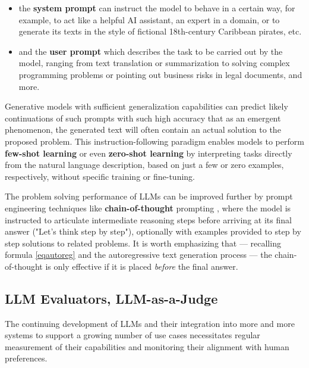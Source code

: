 \documentclass[UTF8,noindent,nohyp,parspace,titlepage,twoside,12pt]{article}
\begin{document}
      \begin{itemize}
        \item the \textbf{system prompt} can instruct the model to behave in a
              certain way, for example, to act like a helpful AI assistant,
              an expert in a domain, or to generate its texts in the style of
              fictional 18th-century Caribbean pirates, etc.

        \item and the \textbf{user prompt} which describes the task to be
              carried out by the model, ranging from text translation or
              summarization to solving complex programming problems or pointing
              out business risks in legal documents, and more.
      \end{itemize}

      Generative models with sufficient generalization capabilities can predict
      likely continuations of such prompts with such high accuracy that as an
      emergent phenomenon, the generated text will often contain an actual
      solution to the proposed problem. This instruction-following paradigm
      enables models to perform \textbf{few-shot learning} \cite{gpt3} or even
      \textbf{zero-shot learning} by interpreting tasks directly from the
      natural language description, based on just a few or zero examples,
      respectively, without specific training or fine-tuning.

      The problem solving performance of LLMs can be improved further by
      prompt engineering techniques like \textbf{chain-of-thought} prompting
      \cite{cot,zscot}, where the model is instructed to articulate intermediate
      reasoning steps before arriving at its final answer ("Let's think step by
      step"), optionally with examples provided to step by step solutions to
      related problems. It is worth emphasizing that --- recalling formula
      \ref{eqautoreg} and the autoregressive text generation process --- the
      chain-of-thought is only effective if it is placed \emph{before} the
      final answer.

    \subsection{LLM Evaluators, LLM-as-a-Judge}

      The continuing development of LLMs and their integration into more and
      more systems to support a growing number of use cases necessitates regular
      measurement of their capabilities and monitoring their alignment with
      human preferences.
\end{document}
